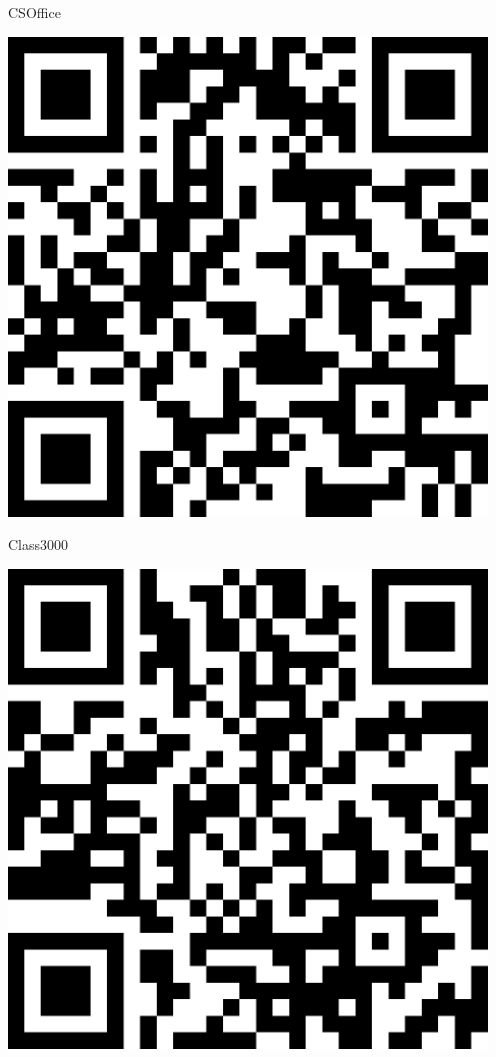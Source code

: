 \documentclass[letterpaper]{article}
\begin{document}
 \hfill{\small CSOffice} 

 \vspace{1in} 
 \pagebreak 
{} 
 \vspace*{\fill} 
 \begingroup 
 \centerline{\includegraphics[scale=1,width=5in,height=5in]{Class3000.png}} 
 \endgroup 
 \vspace*{\fill} 

 \hfill{\small Class3000} 

 \vspace{1in} 
 \pagebreak 
{} 
 \vspace*{\fill} 
 \begingroup 
 \centerline{\includegraphics[scale=1,width=5in,height=5in]{Class3435N.png}} 
 \endgroup 
 \vspace*{\fill} 
\end{document}
